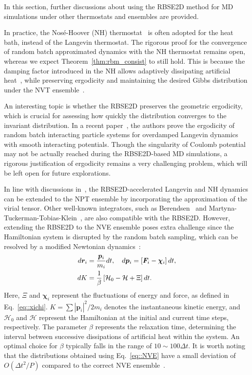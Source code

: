 In this section, further discussions about using the RBSE2D method for MD simulations under other thermostats and ensembles are provided.

In practice, the Nos{\'e}-Hoover (NH) thermostat~\cite{hoover1985canonical} is often adopted for the heat bath, instead of the Langevin thermostat. 
The rigorous proof for the convergence of random batch approximated dynamics with the NH thermostat remains open, whereas we expect Theorem~\ref{thm:rbm_consist} to still hold. 
This is because the damping factor introduced in the NH allows adaptively dissipating artificial heat~\cite{jones2011adaptive}, while preserving ergodicity and maintaining the desired Gibbs distribution under the NVT ensemble~\cite{herzog2018exponential}.

An interesting topic is whether the RBSE2D preserves the geometric ergodicity, which is crucial for assessing how quickly the distribution converges to the invariant distribution. 
In a recent paper~\cite{jin2023ergodicity}, the authors prove the ergodicity of random batch interacting particle systems for overdamped Langevin dynamics with smooth interacting potentials. 
Though the singularity of Coulomb potential may not be actually reached during the RBSE2D-based MD simulations, a rigorous justification of ergodicity remains a very challenging problem, which will be left open for future explorations.

In line with discussions in~\cite{liang2022random}, the RBSE2D-accelerated Langevin and NH dynamics can be extended to the NPT ensemble by incorporating the approximation of the virial tensor. Other well-known integrators, such as Berendsen~\cite{berendsen1984molecular} and Martyna-Tuckerman-Tobias-Klein~\cite{martyna1996explicit}, are also compatible with the RBSE2D. However, extending the RBSE2D to the NVE ensemble poses extra challenge since the Hamiltonian system is disrupted by the random batch sampling, which can be resolved by a modified Newtonian dynamics~\cite{liang2024JCP}:
\begin{equation}\label{eq::NVE}
	\begin{split}
		d\boldsymbol{r}_i&=\frac{\boldsymbol{p}_i}{m_i}dt,\quad d \bm{p}_i=\left[\boldsymbol{F}_i-\bm{\chi}_i\right]dt,\\
		dK&=\frac{1}{\beta}\left[\mathcal H_0-\mathcal H+\Xi\right] dt.
	\end{split}
\end{equation}
Here, $\Xi$ and $\bm{\chi}_i$ represent the fluctuations of energy and force, as defined in Eq.~\eqref{eq::xichi}. $K=\sum |\bm{p}_i|^2/2m_i$ denotes the instantaneous kinetic energy, and $\mathcal H_0$ and $\mathcal H$ represent the Hamiltonian at the initial and current time steps, respectively. The parameter $\beta$ represents the relaxation time, determining the interval between successive dissipations of artificial heat within the system. An optimal choice for $\beta$ typically falls in the range of $10\sim 100\Delta t$. It is worth noting that the distributions obtained using Eq.~\eqref{eq::NVE} have a small deviation of $O(\Delta t^2/P)$ compared to the correct NVE ensemble~\cite{liang2024JCP}.


